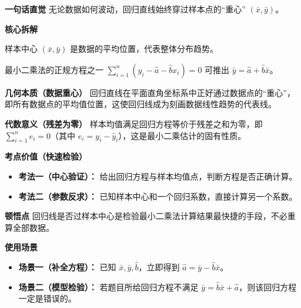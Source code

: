 \begin{explanationbox}
	\textbf{\textcolor{CExplanation}{一句话直觉}}
	无论数据如何波动，回归直线始终穿过样本点的“重心” $(\bar{x},\bar{y})$。

	\medskip
	\textbf{\textcolor{CExplanation}{核心拆解}}
	\begin{description}[style=nextline, leftmargin=2.8em, labelsep=0.5em, itemsep=0.45em]
		\item[\textbf{要点一（样本均值）：}]
			样本中心 $(\bar{x},\bar{y})$ 是数据的平均位置，代表整体分布趋势。
		\item[\textbf{要点二（正规方程）：}]
			最小二乘法的正规方程之一 $\sum_{i=1}^n (y_i - \hat{a} - \hat{b}x_i) = 0$ 可推出 $\bar{y} = \hat{a} + \hat{b}\bar{x}$。
	\end{description}

	\medskip
	\textbf{\textcolor{CExplanation}{几何本质（数据重心）}}
	回归直线在平面直角坐标系中正好通过数据点的“重心”，即所有数据点的平均值位置，这使回归线成为刻画数据线性趋势的代表线。

	\medskip
	\textbf{\textcolor{CExplanation}{代数意义（残差为零）}}
	样本均值满足回归方程等价于残差之和为零，即 $\sum_{i=1}^n e_i = 0$（其中 $e_i = y_i - \hat{y}_i$），这是最小二乘估计的固有性质。

	\medskip
	\textbf{\textcolor{CExplanation}{考点价值（快速检验）}}
	\begin{itemize}[leftmargin=*, itemsep=0.5em, topsep=0.4em]
		\item \textbf{考法一（中心验证）：} 给出回归方程与样本均值点，判断方程是否正确计算。
		\item \textbf{考法二（参数反求）：} 已知样本中心和一个回归系数，直接计算另一个系数。
	\end{itemize}

	\medskip
	\textbf{\textcolor{CExplanation}{顿悟点}}
	回归线是否过样本中心是检验最小二乘法计算结果最快捷的手段，不必重算全部数据。

	\medskip
	\textbf{\textcolor{CExplanation}{使用场景}}
	\begin{itemize}[leftmargin=*, itemsep=0.5em, topsep=0.4em]
		\item \textbf{场景一（补全方程）：} 已知 $\bar{x}, \bar{y}, \hat{b}$，立即得到 $\hat{a} = \bar{y} - \hat{b}\bar{x}$。
		\item \textbf{场景二（模型检验）：} 若题目所给回归方程不满足 $\bar{y} = \hat{b}\bar{x} + \hat{a}$，则该回归方程一定是错误的。
	\end{itemize}

\end{explanationbox}
